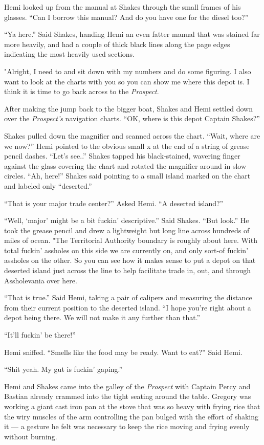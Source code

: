 \documentclass[]{scrbook}
\begin{document}
Hemi looked up from the manual at Shakes through the small frames of his
glasses. ``Can I borrow this manual? And do you have one for the diesel
too?''

``Ya here.'' Said Shakes, handing Hemi an even fatter manual that was
stained far more heavily, and had a couple of thick black lines along
the page edges indicating the most heavily used sections.

"Alright, I need to and sit down with my numbers and do some figuring. I
also want to look at the charts with you so you can show me where this
depot is. I think it is time to go back across to the \emph{Prospect}.

After making the jump back to the bigger boat, Shakes and Hemi settled
down over the \emph{Prospect's} navigation charts. ``OK, where is this
depot Captain Shakes?''

Shakes pulled down the magnifier and scanned across the chart. ``Wait,
where are we now?'' Hemi pointed to the obvious small x at the end of a
string of grease pencil dashes. ``Let's see..'' Shakes tapped his
black-stained, wavering finger against the glass covering the chart and
rotated the magnifier around in slow circles. ``Ah, here!'' Shakes said
pointing to a small island marked on the chart and labeled only
``deserted.''

``That is your major trade center?'' Asked Hemi. ``A deserted island?''

``Well, `major' might be a bit fuckin' descriptive.'' Said Shakes. ``But
look.'' He took the grease pencil and drew a lightweight but long line
across hundreds of miles of ocean. "The Territorial Authority boundary
is roughly about here. With total fuckin' assholes on this side we are
currently on, and only sort-of fuckin' assholes on the other. So you can
see how it makes sense to put a depot on that deserted island just
across the line to help facilitate trade in, out, and through
Assholevania over here.

``That is true.'' Said Hemi, taking a pair of calipers and measuring the
distance from their current position to the deserted island. ``I hope
you're right about a depot being there. We will not make it any further
than that.''

``It'll fuckin' be there!''

Hemi sniffed. ``Smells like the food may be ready. Want to eat?'' Said
Hemi.

``Shit yeah. My gut is fuckin' gaping.''

Hemi and Shakes came into the galley of the \emph{Prospect} with Captain
Percy and Bastian already crammed into the tight seating around the
table. Gregory was working a giant cast iron pan at the stove that was
so heavy with frying rice that the wiry muscles of the arm controlling
the pan bulged with the effort of shaking it --- a gesture he felt was
necessary to keep the rice moving and frying evenly without burning.
\end{document}
